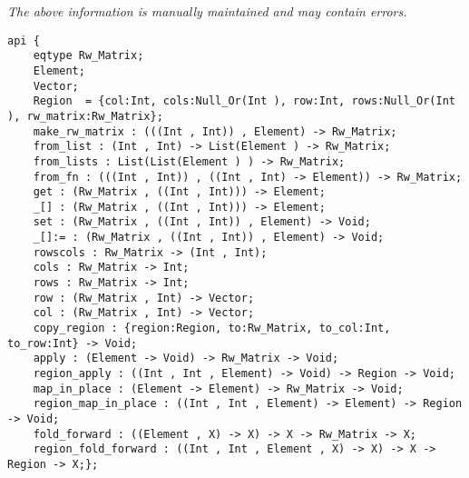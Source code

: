 \label{api:Typelocked\_Rw\_Matrix}

{\tiny \it The above information is manually maintained and may contain errors.}
\begin{verbatim}
api {
    eqtype Rw_Matrix;
    Element;
    Vector;
    Region  = {col:Int, cols:Null_Or(Int ), row:Int, rows:Null_Or(Int ), rw_matrix:Rw_Matrix};
    make_rw_matrix : (((Int , Int)) , Element) -> Rw_Matrix;
    from_list : (Int , Int) -> List(Element ) -> Rw_Matrix;
    from_lists : List(List(Element ) ) -> Rw_Matrix;
    from_fn : (((Int , Int)) , ((Int , Int) -> Element)) -> Rw_Matrix;
    get : (Rw_Matrix , ((Int , Int))) -> Element;
    _[] : (Rw_Matrix , ((Int , Int))) -> Element;
    set : (Rw_Matrix , ((Int , Int)) , Element) -> Void;
    _[]:= : (Rw_Matrix , ((Int , Int)) , Element) -> Void;
    rowscols : Rw_Matrix -> (Int , Int);
    cols : Rw_Matrix -> Int;
    rows : Rw_Matrix -> Int;
    row : (Rw_Matrix , Int) -> Vector;
    col : (Rw_Matrix , Int) -> Vector;
    copy_region : {region:Region, to:Rw_Matrix, to_col:Int, to_row:Int} -> Void;
    apply : (Element -> Void) -> Rw_Matrix -> Void;
    region_apply : ((Int , Int , Element) -> Void) -> Region -> Void;
    map_in_place : (Element -> Element) -> Rw_Matrix -> Void;
    region_map_in_place : ((Int , Int , Element) -> Element) -> Region -> Void;
    fold_forward : ((Element , X) -> X) -> X -> Rw_Matrix -> X;
    region_fold_forward : ((Int , Int , Element , X) -> X) -> X -> Region -> X;};
\end{verbatim}
\index[fun]{\_[]:=}
\index[fun]{\_[]}
